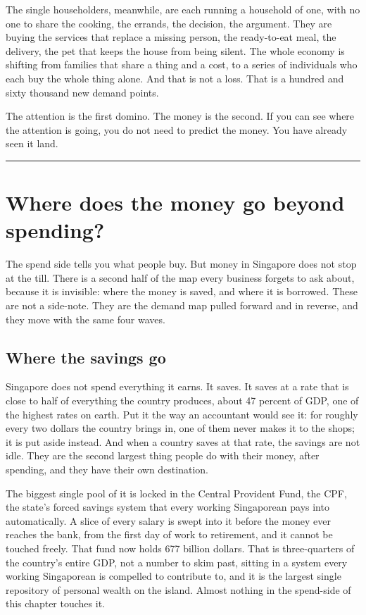 \documentclass[10pt,twoside,openany]{memoir}
\newcommand{\needspacehead}{\needspace{4\baselineskip}}
\let\oldsection\section
\renewcommand{\section}{\needspacehead\oldsection}
\begin{document}
{{{{{{{{{{{{{{{{{The single householders, meanwhile, are each running a household of one,
with no one to share the cooking, the errands, the decision, the
argument. They are buying the services that replace a missing person,
the ready-to-eat meal, the delivery, the pet that keeps the house from
being silent. The whole economy is shifting from families that share a
thing and a cost, to a series of individuals who each buy the whole
thing alone. And that is not a loss. That is a hundred and sixty
thousand new demand points.

The attention is the first domino. The money is the second. If you can
see where the attention is going, you do not need to predict the money.
You have already seen it land.

\begin{center}\rule{0.5\linewidth}{0.5pt}\end{center}

\FloatBarrier
\chapter{Where does the money go beyond
spending?}\label{where-does-the-money-go-beyond-spending}

The spend side tells you what people buy. But money in Singapore does
not stop at the till. There is a second half of the map every business
forgets to ask about, because it is invisible: where the money is saved,
and where it is borrowed. These are not a side-note. They are the demand
map pulled forward and in reverse, and they move with the same four
waves.

\section{Where the savings go}\label{where-the-savings-go}

Singapore does not spend everything it earns. It saves. It saves at a
rate that is close to half of everything the country produces, about 47
percent of GDP, one of the highest rates on earth. Put it the way an
accountant would see it: for roughly every two dollars the country
brings in, one of them never makes it to the shops; it is put aside
instead. And when a country saves at that rate, the savings are not
idle. They are the second largest thing people do with their money,
after spending, and they have their own destination.

The biggest single pool of it is locked in the Central Provident Fund,
the CPF, the state's forced savings system that every working
Singaporean pays into automatically. A slice of every salary is swept
into it before the money ever reaches the bank, from the first day of
work to retirement, and it cannot be touched freely. That fund now holds
677 billion dollars. That is three-quarters of the country's entire GDP,
not a number to skim past, sitting in a system every working Singaporean
is compelled to contribute to, and it is the largest single repository
of personal wealth on the island. Almost nothing in the spend-side of
this chapter touches it.

}}}}}}}}}}}}}}}}}
\end{document}

